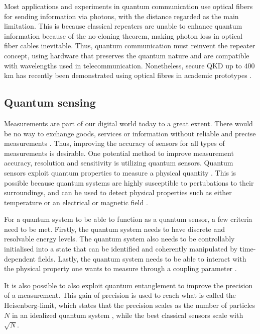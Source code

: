 Most applications and experiments in quantum communication use optical fibers for sending information via photons, with the distance regarded as the main limitation. This is because classical repeaters are unable to enhance quantum information because of the no-cloning theorem, making photon loss in optical fiber cables inevitable. Thus, quantum communication must reinvent the repeater concept, using hardware that preserves the quantum nature \cite{Acin2018} and are compatible with wavelengths used in telecommunication. Nonetheless, secure QKD up to $400$ km has recently been demonstrated using optical fibres in academic prototypes \cite{Boaron2018}.

\subsection{Quantum sensing}

Measurements are part of our digital world today to a great extent. There would be no way to exchange goods, services or information without reliable and precise measurements \cite{Acin2018}. Thus, improving the accuracy of sensors for all types of measurements is desirable. One potential method to improve measurement accuracy, resolution and sensitivity is utilizing quantum sensors. Quantum sensors exploit quantum properties to measure a physical quantity \cite{Degen2017}. This is possible because quantum systems are highly susceptible to pertubations to their surroundings, and can be used to detect physical properties such as either temperature or an electrical or magnetic field \cite{Degen2017}.

For a quantum system to be able to function as a quantum sensor, a few criteria need to be met.  Firstly, the quantum system needs to have discrete and resolvable energy levels. The quantum system also needs to be controllably initialised into a state that can be identified and coherently manipulated by time-dependent fields. Lastly, the quantum system needs to be able to interact with the physical property one wants to measure through a coupling parameter \cite{Degen2017}.

It is also possible to also exploit quantum entanglement to improve the precision of a measurement. This gain of precision is used to reach what is called the Heisenberg-limit, which states that the precision scales as the number of particles $N$ in an idealized quantum system \cite{Degen2017, Acin2018}, while the best classical sensors scale with $\sqrt{N}$.

